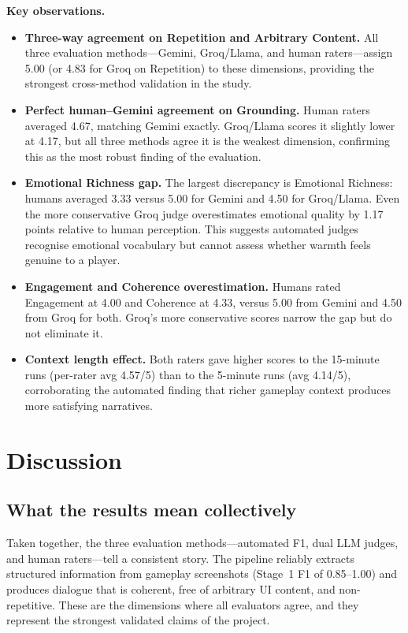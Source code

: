 \documentclass[11pt]{article}
\begin{document}
\noindent\textbf{Key observations.}
\begin{itemize}
  \item \textbf{Three-way agreement on Repetition and Arbitrary Content.} All three evaluation methods---Gemini, Groq/Llama, and human raters---assign 5.00 (or 4.83 for Groq on Repetition) to these dimensions, providing the strongest cross-method validation in the study.
  \item \textbf{Perfect human--Gemini agreement on Grounding.} Human raters averaged 4.67, matching Gemini exactly. Groq/Llama scores it slightly lower at 4.17, but all three methods agree it is the weakest dimension, confirming this as the most robust finding of the evaluation.
  \item \textbf{Emotional Richness gap.} The largest discrepancy is Emotional Richness: humans averaged 3.33 versus 5.00 for Gemini and 4.50 for Groq/Llama. Even the more conservative Groq judge overestimates emotional quality by 1.17 points relative to human perception. This suggests automated judges recognise emotional vocabulary but cannot assess whether warmth feels genuine to a player.
  \item \textbf{Engagement and Coherence overestimation.} Humans rated Engagement at 4.00 and Coherence at 4.33, versus 5.00 from Gemini and 4.50 from Groq for both. Groq's more conservative scores narrow the gap but do not eliminate it.
  \item \textbf{Context length effect.} Both raters gave higher scores to the 15-minute runs (per-rater avg 4.57/5) than to the 5-minute runs (avg 4.14/5), corroborating the automated finding that richer gameplay context produces more satisfying narratives.
\end{itemize}

\section{Discussion}

\subsection{What the results mean collectively}

Taken together, the three evaluation methods---automated F1, dual LLM judges, and human raters---tell a consistent story. The pipeline reliably extracts structured information from gameplay screenshots (Stage~1 F1 of 0.85--1.00) and produces dialogue that is coherent, free of arbitrary UI content, and non-repetitive. These are the dimensions where all evaluators agree, and they represent the strongest validated claims of the project.
\end{document}
